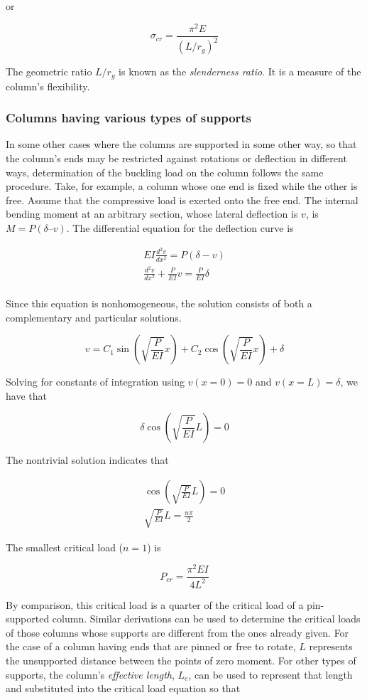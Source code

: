 \documentclass[a4paper,openany,nobib]{tufte-book}
\begin{document}
{{or

$$\sigma_{cr} = \frac{\pi ^2E}{(L/r_g)^2}$$

The geometric ratio \(L/r_g\) is known as the \emph{slenderness ratio}. It is a
measure of the column's flexibility.

\subsubsection{Columns having various types of supports}
\label{columns-having-various-types-of-supports}
In some other cases where the columns are supported in some other way,
so that the column's ends may be restricted against rotations or
deflection in different ways, determination of the buckling load on the
column follows the same procedure. Take, for example, a column whose one
end is fixed while the other is free. Assume that the compressive load
is exerted onto the free end. The internal bending moment at an
arbitrary section, whose lateral deflection is \(v\), is
\(M = P(\delta – v)\). The differential equation for the deflection curve
is


$$\begin{gathered}
  EI\frac{d^2v}{dx^2} = P(\delta  - v) \\ 
  \frac{d^2v}{dx^2} + \frac{P}{EI}v = \frac{P}{EI}\delta  \\ \end{gathered}$$

Since this equation is nonhomogeneous, the solution consists of both a
complementary and particular solutions.

$$v = C_1\sin \left( \sqrt {\frac{P}{EI}} x \right) + C_2\cos \left( \sqrt {\frac{P}{EI}} x \right) + \delta$$

Solving for constants of integration using \(v(x = 0) = 0\) and
\(v(x = L) = \delta\), we have that

$$\delta \cos \left( \sqrt {\frac{P}{EI}} L \right) = 0$$

The nontrivial solution indicates that

$$\begin{gathered}
  \cos \left( \sqrt {\frac{P}{EI}} L \right) = 0 \\
  \sqrt {\frac{P}{EI}} L = \frac{n\pi }{2}\end{gathered}$$

The smallest critical load (\(n = 1\)) is

$$P_{cr} = \frac{\pi^2EI}{4L^2}$$

By comparison, this critical load is a quarter of the critical load of a
pin-supported column. Similar derivations can be used to determine the
critical loads of those columns whose supports are different from the
ones already given. For the case of a column having ends that are pinned
or free to rotate, \(L\) represents the unsupported distance between the
points of zero moment. For other types of supports, the column's
\emph{effective length}, \(L_e\), can be used to represent that length and
substituted into the critical load equation so that

}}
\end{document}
